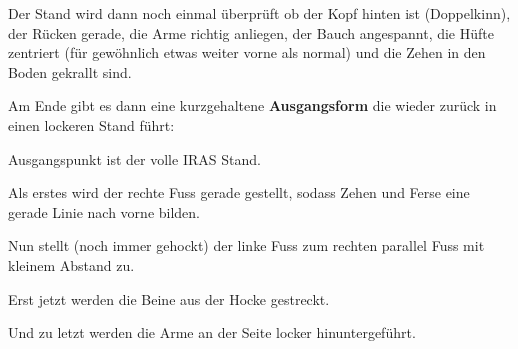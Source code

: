 Der Stand wird dann noch einmal \"uberpr\"uft ob der Kopf hinten ist (Doppelkinn), der R\"ucken gerade, die Arme richtig anliegen, der Bauch angespannt, die H\"ufte zentriert (f\"ur gew\"ohnlich etwas weiter vorne als normal)  und die Zehen in den Boden gekrallt sind.





Am Ende gibt es dann eine kurzgehaltene \textbf{Ausgangsform} die wieder zur\"uck in einen lockeren Stand f\"uhrt:

\begin{WTalphenumNarrow}
	\item Ausgangspunkt ist der volle IRAS Stand.
	\item Als erstes wird der rechte Fuss gerade gestellt, sodass Zehen und Ferse eine gerade Linie nach vorne bilden.
	\item Nun stellt (noch immer gehockt) der linke Fuss zum rechten parallel Fuss mit kleinem Abstand zu.
	\item Erst jetzt werden die Beine aus der Hocke gestreckt.
	\item Und zu letzt werden die Arme an der Seite locker hinuntergef\"uhrt.
\end{WTalphenumNarrow}


\newpage



% 


